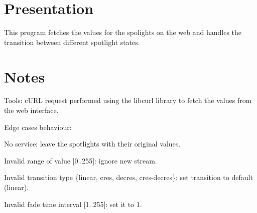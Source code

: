 \hypertarget{index_Presentation}{}\section{Presentation}\label{index_Presentation}
This program fetches the values for the spolights on the web and handles the transition between different spotlight states.\hypertarget{index_Notes}{}\section{Notes}\label{index_Notes}
Tools\+: c\+U\+R\+L request performed using the libcurl library to fetch the values from the web interface.

Edge cases behaviour\+:
\begin{DoxyItemize}
\item No service\+: leave the spotlights with their original values.
\item Invalid range of value \mbox{[}0..255\mbox{]}\+: ignore new stream.
\item Invalid transition type \{linear, cres, decres, cres-\/decres\}\+: set transition to default (linear).
\item Invalid fade time interval \mbox{[}1..255\mbox{]}\+: set it to 1. 
\end{DoxyItemize}